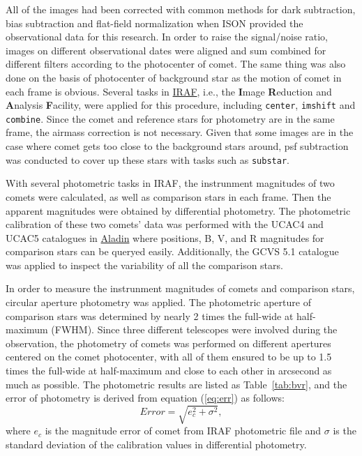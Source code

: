 All of the images had been corrected with common methods for dark subtraction, bias subtraction and flat-field normalization when ISON provided the observational data for this research. In order to raise the signal/noise ratio, images on different observational dates were aligned and sum combined for different filters according to the photocenter of comet. The same thing was also done on the basis of photocenter of background star as the motion of comet in each frame is obvious. Several tasks in {\href{https://github.com/iraf-community/iraf}{IRAF}}, i.e., the \textbf{I}mage \textbf{R}eduction and \textbf{A}nalysis \textbf{F}acility, were applied for this procedure, including \texttt{center}, \verb|imshift| and \verb|combine|. Since the comet and reference stars for photometry are in the same frame, the airmass correction is not necessary. Given that some images are in the case where comet gets too close to the background stars around, psf subtraction was conducted to cover up these stars with tasks such as \verb|substar|. 

With several photometric tasks in IRAF, the instrunment magnitudes of two comets were calculated, as well as comparison stars in each frame. Then the apparent magnitudes were obtained by differential photometry. The photometric calibration of these two comets' data was performed with the UCAC4 \citep{zacharias_fourth_2013} and UCAC5 \citep{zacharias_ucac5_2017} catalogues in 
{\href{http://aladin.u-strasbg.fr}{Aladin}} 
where positions, B, V, and R magnitudes for comparison stars can be queryed easily. Additionally, the GCVS 5.1 \citep{samus_general_2017} catalogue was applied to inspect the variability of all the comparison stars. 

In order to measure the  instrunment magnitudes of comets and comparison stars, circular aperture photometry was applied. The photometric aperture of comparison stars was determined by nearly \si{\num{2}} times the full-wide at half-maximum (FWHM). Since three different telescopes were involved during the observation, the photometry of comets was performed on different apertures centered on the comet photocenter, with all of them ensured to be up to \si{\num{1.5}} times the full-wide at half-maximum and close to each other in arcsecond as much as possible. The photometric results are listed as Table~\ref{tab:bvr}, and the error of photometry is derived from equation (\ref{eq:err}) as follows: 
\begin{equation}
    Error = \sqrt{e_{c}^{2} + \sigma^2}, 
    \label{eq:err}
\end{equation}
where $e_c$ is the magnitude error of comet from IRAF photometric file and $\sigma$ is the standard deviation of the calibration values in differential photometry. 


